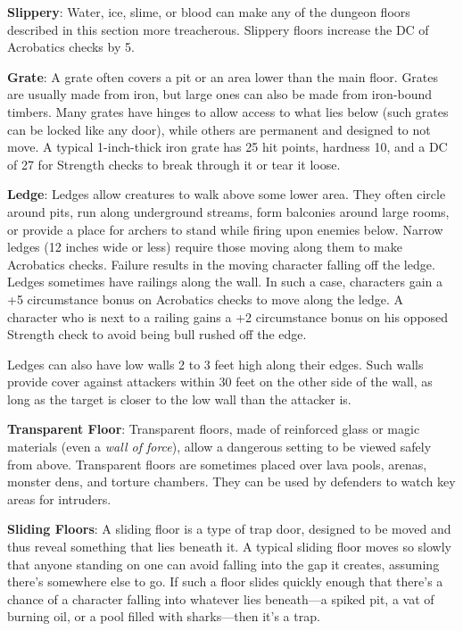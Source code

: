 \textbf{Slippery}: Water, ice, slime, or blood can make any of the dungeon floors described in this section more treacherous. Slippery floors increase the DC of Acrobatics checks by 5. 
				
\textbf{Grate}: A grate often covers a pit or an area lower than the main floor. Grates are usually made from iron, but large ones can also be made from iron-bound timbers. Many grates have hinges to allow access to what lies below (such grates can be locked like any door), while others are permanent and designed to not move. A typical 1-inch-thick iron grate has 25 hit points, hardness 10, and a DC of 27 for Strength checks to break through it or tear it loose.
				
\textbf{Ledge}: Ledges allow creatures to walk above some lower area. They often circle around pits, run along underground streams, form balconies around large rooms, or provide a place for archers to stand while firing upon enemies below. Narrow ledges (12 inches wide or less) require those moving along them to make Acrobatics checks. Failure results in the moving character falling off the ledge. Ledges sometimes have railings along the wall. In such a case, characters gain a +5 circumstance bonus on Acrobatics checks to move along the ledge. A character who is next to a railing gains a +2 circumstance bonus on his opposed Strength check to avoid being bull rushed off the edge.
				
Ledges can also have low walls 2 to 3 feet high along their edges. Such walls provide cover against attackers within 30 feet on the other side of the wall, as long as the target is closer to the low wall than the attacker is.
				
\textbf{Transparent Floor}: Transparent floors, made of reinforced glass or magic materials (even a \textit{wall of force}), allow a dangerous setting to be viewed safely from above. Transparent floors are sometimes placed over lava pools, arenas, monster dens, and torture chambers. They can be used by defenders to watch key areas for intruders.
				
\textbf{Sliding Floors}: A sliding floor is a type of trap door, designed to be moved and thus reveal something that lies beneath it. A typical sliding floor moves so slowly that anyone standing on one can avoid falling into the gap it creates, assuming there's somewhere else to go. If such a floor slides quickly enough that there's a chance of a character falling into whatever lies beneath---a spiked pit, a vat of burning oil, or a pool filled with sharks---then it's a trap.
				
